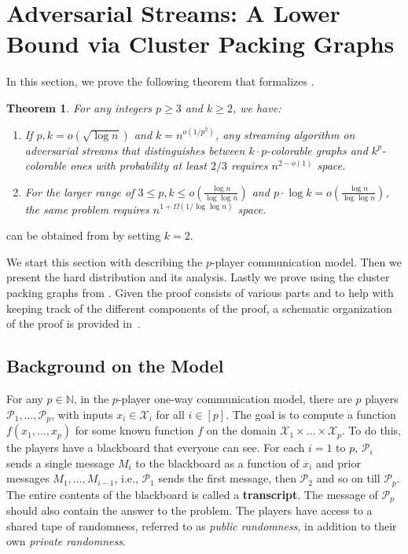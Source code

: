 \documentclass[11pt]{article}
\newtheorem{theorem}{Theorem}
\theoremstyle{definition}
\renewcommand{\leq}{\leqslant}
\renewcommand{\geq}{\geqslant}
\newcommand{\IN}{\ensuremath{\mathbb{N}}}
\newcommand{\player}[1]{\ensuremath{\mathcal{P}_{#1}}}
\begin{document}

\section{Adversarial Streams: A Lower Bound via Cluster Packing Graphs}\label{sec:adversarial} 

In this section, we prove the following theorem that formalizes .
\begin{theorem}\label{thm:adv-res}
	For any integers $p \geq 3$ and $k \geq 2$, we have:
	\begin{enumerate}
		\item If $p,k = o(\sqrt{\log n})$ and $ k = n^{o(1/p^2)}$, any streaming algorithm on adversarial streams that distinguishes between $k\cdot p$-colorable graphs and $k^p$-colorable ones with probability at least $2/3$ requires $n^{2-o(1)}$ space.
	
	\item 
	For the larger range of $3\leq p, k\leq o(\frac{\log n}{\log \log n})$ and $p \cdot \log k = o(\frac{\log n}{\log \log n})$, the same problem requires $n^{1+\Omega(1/\log\log n)}$ space.
	\end{enumerate}
\end{theorem}

 can be obtained from  by setting $k = 2$. 

We start this section with describing the $p$-player communication model. Then we present the hard distribution and its analysis. Lastly we prove  using the cluster packing graphs from .
Given the proof consists of various parts and to help with keeping track of the different components of the proof, a schematic organization of the proof is provided in~. 

\subsection{Background on the Model}\label{subsec:p-player-back}
For any $p\in \IN$, in the $p$-player one-way communication model, there are $p$ players $\player{1}, \ldots, \player{p}$, with inputs $x_i \in \mathcal{X}_i$ for all $i\in[p]$. The goal is to compute a function $f(x_1, \ldots, x_p)$ for some known function $f$ on the domain $\mathcal{X}_1\times \ldots \times \mathcal{X}_p$. 
To do this, the players have a blackboard that everyone can see. For each $i = 1$ to $p$, $\player{i}$ sends a single message $M_i$ to the blackboard as a function of $x_i$ and prior messages $M_1,\ldots,M_{i-1}$, i.e., $\player{1}$ sends the first message, then $\player{2}$ and so on till $\player{p}$. The entire contents of the blackboard is called a \textbf{transcript}.
 The message of $\player{p}$ should also contain the answer to the problem. The players have access to a shared tape of randomness, referred to as \textit{public randomness}, in addition to their own \textit{private randomness}. 
\end{document}

